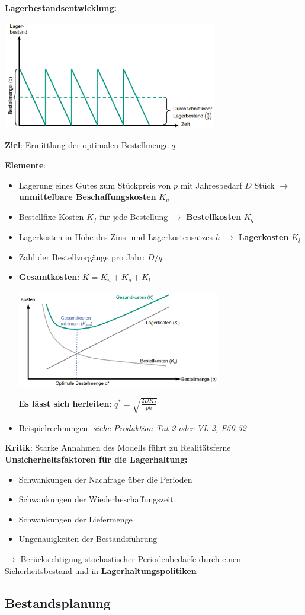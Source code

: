 \textbf{Lagerbestandsentwicklung:}
\begin{center}
	\includegraphics[width=0.7\textwidth]{images/lagerbestandsentwicklung.png}
\end{center}
\textbf{Ziel}: Ermittlung der optimalen Bestellmenge $q$

\textbf{Elemente}: 
\begin{itemize}
	\item Lagerung eines Gutes zum Stückpreis von $p$ mit Jahresbedarf $D$ Stück $\rightarrow$ \textbf{unmittelbare Beschaffungskosten} $K_u$
	\item Bestellfixe Kosten $K_f$ für jede Bestellung $\rightarrow$ \textbf{Bestellkosten} $K_q$
	\item Lagerkosten in Höhe des Zins- und Lagerkostensatzes $h$ $\rightarrow$ \textbf{Lagerkosten} $K_l$
	\item Zahl der Bestellvorgänge pro Jahr: $D/q$
	\item \textbf{Gesamtkosten}: $K=K_u+K_q+K_l$
	\begin{center}
		\includegraphics[width=0.7\textwidth]{images/haa.png}
	\end{center}
	\textbf{Es lässt sich herleiten}: $q^*=\sqrt{\frac{2DK_f}{ph}}$
	\item Beispielrechnungen: \textit{siehe Produktion Tut 2 oder VL 2, F50-52}
\end{itemize}

\textbf{Kritik}: Starke Annahmen des Modells führt zu Realitätsferne\\

\textbf{Unsicherheitsfaktoren für die Lagerhaltung:} 
\begin{itemize}
	\item Schwankungen der Nachfrage über die Perioden
	\item Schwankungen der Wiederbeschaffungszeit
	\item Schwankungen der Liefermenge
	\item Ungenauigkeiten der Bestandsführung
\end{itemize}
$\rightarrow$ Berücksichtigung stochastischer Periodenbedarfe durch einen
Sicherheitsbestand und in \textbf{Lagerhaltungspolitiken}

\subsection{Bestandsplanung}
